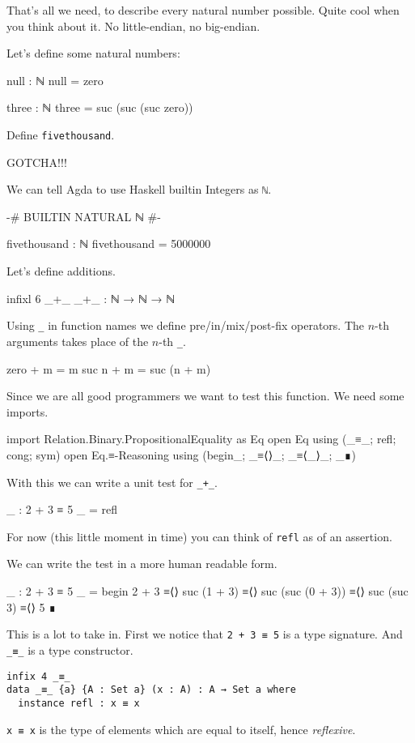 That's all we need, to describe every natural number possible.
Quite cool when you think about it. No little-endian, no big-endian.

Let's define some natural numbers:
\begin{code}
null : ℕ
null = zero

three : ℕ
three = suc (suc (suc zero))
\end{code}

\begin{exercise}
  Define \verb+fivethousand+.
\end{exercise}

GOTCHA!!!

We can tell Agda to use Haskell builtin Integers as \verb+ℕ+.

\begin{code}
{-# BUILTIN NATURAL ℕ #-}

fivethousand : ℕ
fivethousand = 5000000
\end{code}

Let's define additions.
\begin{code}
infixl 6 _+_
_+_ : ℕ → ℕ → ℕ
\end{code}

Using \verb+_+ in function names we define pre/in/mix/post-fix operators. The
$n$-th arguments takes place of the $n$-th \verb+_+.
\begin{code}
zero + m = m
suc n + m = suc (n + m)
\end{code}

Since we are all good programmers we want to test this function.
We need some imports.
\begin{code}
import Relation.Binary.PropositionalEquality as Eq
open Eq using (_≡_; refl; cong; sym)
open Eq.≡-Reasoning using (begin_; _≡⟨⟩_; _≡⟨_⟩_; _∎)
\end{code}

With this we can write a unit test for \verb=_+_=.
\begin{code}
_ : 2 + 3 ≡ 5
_ = refl
\end{code}
For now (this little moment in time) you can think of \verb+refl+ as
of an assertion.

We can write the test in a more human readable form.
\begin{code}
_ : 2 + 3 ≡ 5
_ =
  begin
    2 + 3
  ≡⟨⟩
    suc (1 + 3)
  ≡⟨⟩
    suc (suc (0 + 3))
  ≡⟨⟩
    suc (suc 3)
  ≡⟨⟩
    5
  ∎
\end{code}

This is a lot to take in. First we notice that \verb=2 + 3 ≡ 5= is a type signature.
And \verb+_≡_+ is a type constructor.
\begin{verbatim}
infix 4 _≡_
data _≡_ {a} {A : Set a} (x : A) : A → Set a where
  instance refl : x ≡ x
\end{verbatim}
\verb+x ≡ x+ is the type of elements which are equal to itself, hence \emph{reflexive}.

